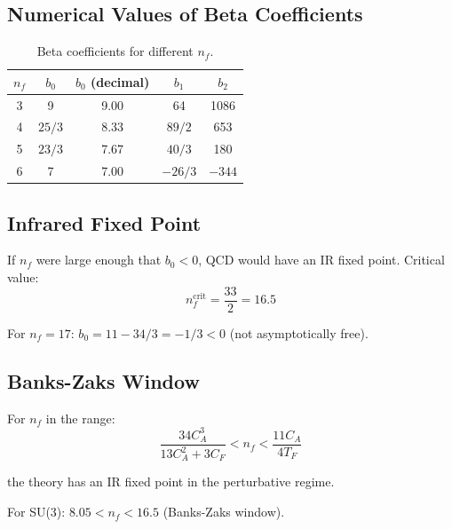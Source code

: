 \documentclass[11pt,a4paper]{article}
\theoremstyle{definition}
\begin{document}
\subsection{Numerical Values of Beta Coefficients}
\label{subsec:beta-numerical}

\begin{table}[ht]
\centering
\caption{Beta coefficients for different $n_f$.}
\label{tab:beta-numerical}
\begin{tabular}{ccccc}
\toprule
$n_f$ & $b_0$ & $b_0$ (decimal) & $b_1$ & $b_2$ \\
\midrule
3 & 9 & 9.00 & 64 & 1086 \\
4 & $25/3$ & 8.33 & $89/2$ & 653 \\
5 & $23/3$ & 7.67 & $40/3$ & 180 \\
6 & 7 & 7.00 & $-26/3$ & $-344$ \\
\bottomrule
\end{tabular}
\end{table}

\subsection{Infrared Fixed Point}
\label{subsec:ir-fixed}

If $n_f$ were large enough that $b_0 < 0$, QCD would have an IR fixed point.
Critical value:
\begin{equation}
\label{eq:nf-crit}
n_f^{\text{crit}} = \frac{33}{2} = 16.5
\end{equation}

For $n_f = 17$: $b_0 = 11 - 34/3 = -1/3 < 0$ (not asymptotically free).

\subsection{Banks-Zaks Window}
\label{subsec:banks-zaks}

For $n_f$ in the range:
\begin{equation}
\label{eq:banks-zaks}
\frac{34C_A^3}{13C_A^2 + 3C_F} < n_f < \frac{11C_A}{4T_F}
\end{equation}

the theory has an IR fixed point in the perturbative regime.

For SU(3): $8.05 < n_f < 16.5$ (Banks-Zaks window).

\end{document}
